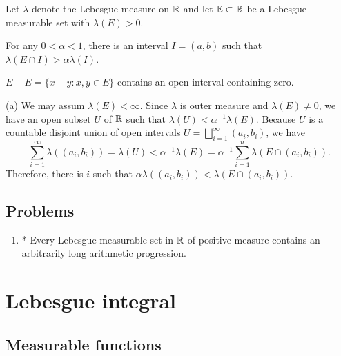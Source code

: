 \documentclass{../../large}
\begin{document}
\begin{prb}
Let $\lambda$ denote the Lebesgue measure on $\mathbb{R}$ and let $\mathbb{E}\subset\mathbb{R}$ be a Lebesgue measurable set with $\lambda(E)>0$.
\begin{parts}
\item For any $0<\alpha<1$, there is an interval $I=(a,b)$ such that $\lambda(E\cap I)>\alpha\lambda(I)$.
\item $E-E=\{x-y:x,y\in E\}$ contains an open interval containing zero.
\end{parts}
\begin{pf}
(a)
We may assum $\lambda(E)<\infty$.
Since $\lambda$ is outer measure and $\lambda(E)\ne0$, we have an open subset $U$ of $\mathbb{R}$ such that $\lambda(U)<\alpha^{-1}\lambda(E)$.
Because $U$ is a countable disjoint union of open intervals $U=\bigsqcup_{i=1}^\infty(a_i,b_i)$, we have
\[\sum_{i=1}^\infty\lambda((a_i,b_i))=\lambda(U)<\alpha^{-1}\lambda(E)=\alpha^{-1}\sum_{i=1}^n\lambda(E\cap(a_i,b_i)).\]
Therefore, there is $i$ such that $\alpha\lambda((a_i,b_i))<\lambda(E\cap(a_i,b_i))$.
\end{pf}
\end{prb}




\section*{Problems}
\begin{enumerate}
\item* Every Lebesgue measurable set in $\mathbb{R}$ of positive measure contains an arbitrarily long arithmetic progression.
\end{enumerate}

















\chapter{Lebesgue integral}



\section{Measurable functions}
\end{document}
